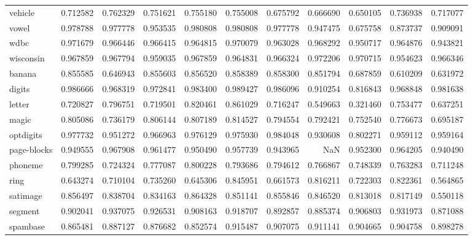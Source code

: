 \begin{tabular}{lrrrrrrrrrr}
vehicle         &   0.712582 &  0.762329 &  0.751621 &  0.755180 &  0.755008 &  0.675792 &  0.666690 &  0.650105 &  0.736938 &  0.717077 \\
vowel           &   0.978788 &  0.977778 &  0.953535 &  0.980808 &  0.980808 &  0.977778 &  0.947475 &  0.675758 &  0.873737 &  0.909091 \\
wdbc            &   0.971679 &  0.966446 &  0.966415 &  0.964815 &  0.970079 &  0.963028 &  0.968292 &  0.950717 &  0.964876 &  0.943821 \\
wisconsin       &   0.967859 &  0.967794 &  0.959035 &  0.967859 &  0.964831 &  0.966324 &  0.972206 &  0.970715 &  0.954623 &  0.966346 \\
banana          &   0.855585 &  0.646943 &  0.855603 &  0.856520 &  0.858389 &  0.858300 &  0.851794 &  0.687859 &  0.610209 &  0.631972 \\
digits          &   0.986666 &  0.968319 &  0.972841 &  0.983400 &  0.989427 &  0.986096 &  0.910254 &  0.816843 &  0.968848 &  0.981638 \\
letter          &   0.720827 &  0.796751 &  0.719501 &  0.820461 &  0.861029 &  0.716247 &  0.549663 &  0.321460 &  0.753477 &  0.637251 \\
magic           &   0.805086 &  0.736179 &  0.806144 &  0.807189 &  0.814527 &  0.794554 &  0.792421 &  0.752540 &  0.776673 &  0.695187 \\
optdigits       &   0.977732 &  0.951272 &  0.966963 &  0.976129 &  0.975930 &  0.984048 &  0.930608 &  0.802271 &  0.959112 &  0.959164 \\
page-blocks     &   0.949555 &  0.967908 &  0.961477 &  0.950490 &  0.957739 &  0.943965 &       NaN &  0.952300 &  0.964205 &  0.940490 \\
phoneme         &   0.799285 &  0.724324 &  0.777087 &  0.800228 &  0.793686 &  0.794612 &  0.766867 &  0.748339 &  0.763283 &  0.711248 \\
ring            &   0.643274 &  0.710104 &  0.735260 &  0.645306 &  0.845951 &  0.661573 &  0.816211 &  0.722303 &  0.822361 &  0.564865 \\
satimage        &   0.856497 &  0.838704 &  0.834163 &  0.864328 &  0.851141 &  0.855846 &  0.846520 &  0.813018 &  0.817149 &  0.550118 \\
segment         &   0.902041 &  0.937075 &  0.926531 &  0.908163 &  0.918707 &  0.892857 &  0.885374 &  0.906803 &  0.931973 &  0.871088 \\
spambase        &   0.865481 &  0.887127 &  0.876682 &  0.852574 &  0.915487 &  0.907075 &  0.911141 &  0.904665 &  0.904758 &  0.898278 \\

\end{tabular}
